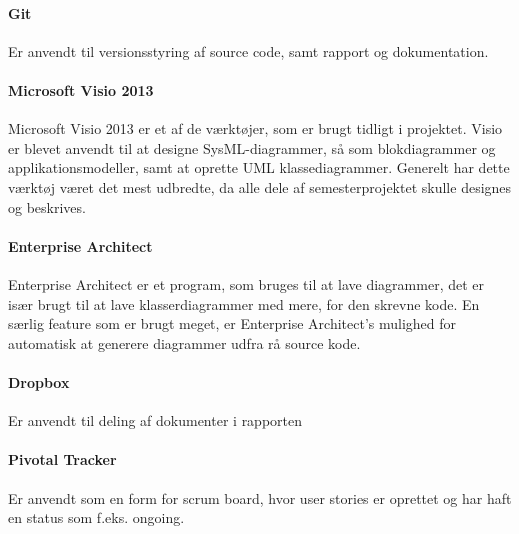 \paragraph{Git}
Er anvendt til versionsstyring af source code, samt rapport og dokumentation.

\paragraph{Microsoft Visio 2013}
Microsoft Visio 2013 er et af de værktøjer, som er brugt tidligt i projektet. Visio er blevet anvendt til at designe SysML-diagrammer, så som blokdiagrammer og applikationsmodeller, samt at oprette UML klassediagrammer. Generelt har dette værktøj været det mest udbredte, da alle dele af semesterprojektet skulle designes og beskrives.

\paragraph{Enterprise Architect}
Enterprise Architect er et program, som bruges til at lave diagrammer, det er især brugt til at lave klasserdiagrammer med mere, for den skrevne kode. En særlig feature som er brugt meget, er Enterprise Architect's mulighed for automatisk at generere diagrammer udfra rå source kode.

\paragraph{Dropbox}
Er anvendt til deling af dokumenter i rapporten

\paragraph{Pivotal Tracker}
Er anvendt som en form for scrum board, hvor user stories er oprettet og har haft en status som f.eks. ongoing. 
